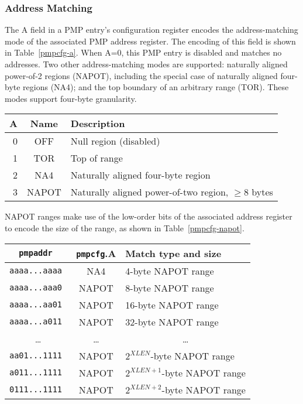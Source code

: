 \subsubsection*{Address Matching}

The A field in a PMP entry's configuration register encodes the
address-matching mode of the associated PMP address register.  The encoding of
this field is shown in Table~\ref{pmpcfg-a}.  When A=0, this PMP entry is
disabled and matches no addresses.  Two other address-matching modes are
supported: naturally aligned power-of-2 regions (NAPOT), including the special
case of naturally aligned four-byte regions (NA4); and the top boundary of an
arbitrary range (TOR).  These modes support four-byte granularity.

\begin{table*}[h!]
\begin{center}
\begin{tabular}{|r|c|l|}
\hline
A & Name & Description \\
\hline
0 & OFF   & Null region (disabled) \\
1 & TOR   & Top of range \\
2 & NA4   & Naturally aligned four-byte region \\
3 & NAPOT & Naturally aligned power-of-two region, $\ge$8 bytes \\
\hline
\end{tabular}
\end{center}
\caption{Encoding of A field in PMP configuration registers.}
\label{pmpcfg-a}
\end{table*}

NAPOT ranges make use of the low-order bits of the associated address register
to encode the size of the range, as shown in Table~\ref{pmpcfg-napot}.

\begin{table*}[h!]
\begin{center}
  \begin{tabular}{|c|c|l|}
  \hline
  \tt pmpaddr    & {\tt pmpcfg}.A & Match type and size \\
  \hline
  \tt aaaa...aaaa & NA4   & 4-byte NAPOT range \\
  \tt aaaa...aaa0 & NAPOT & 8-byte NAPOT range \\
  \tt aaaa...aa01 & NAPOT & 16-byte NAPOT range \\
  \tt aaaa...a011 & NAPOT & 32-byte NAPOT range \\
  \multicolumn{1}{|c|}{\ldots} &  \ldots  & \multicolumn{1}{|c|}{\ldots} \\
  \tt aa01...1111 & NAPOT & $2^{XLEN}$-byte NAPOT range \\
  \tt a011...1111 & NAPOT & $2^{XLEN+1}$-byte NAPOT range \\
  \tt 0111...1111 & NAPOT & $2^{XLEN+2}$-byte NAPOT range \\
  \hline
  \end{tabular}
\end{center}
\caption{NAPOT range encoding in PMP address and configuration registers.}
\label{pmpcfg-napot}
\end{table*}

